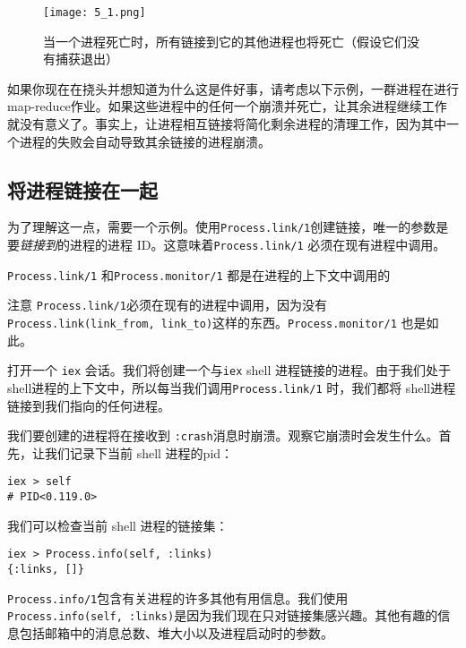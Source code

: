 \begin{figure}[!ht]
    \centering
    \texttt{[image: 5\_1.png]}
    \caption{当一个进程死亡时，所有链接到它的其他进程也将死亡（假设它们没有捕获退出）}
    \label{fig:5_1}
\end{figure}


如果你现在在挠头并想知道为什么这是件好事，请考虑以下示例，一群进程在进行map-reduce作业。如果这些进程中的任何一个崩溃并死亡，让其余进程继续工作就没有意义了。事实上，让进程相互链接将简化剩余进程的清理工作，因为其中一个进程的失败会自动导致其余链接的进程崩溃。


\subsection{将进程链接在一起}

为了理解这一点，需要一个示例。使用\texttt{Process.link/1}创建链接，唯一的参数是要\emph{链接到}的进程的进程 ID。这意味着\texttt{Process.link/1} 必须在现有进程中调用。

\texttt{Process.link/1} 和\texttt{Process.monitor/1} 都是在进程的上下文中调用的

注意 \texttt{Process.link/1}必须在现有的进程中调用，因为没有\texttt{Process.link(link\_from, link\_to)}这样的东西。\texttt{Process.monitor/1} 也是如此。

打开一个 \texttt{iex} 会话。我们将创建一个与\texttt{iex} shell 进程链接的进程。由于我们处于 shell进程的上下文中，所以每当我们调用\texttt{Process.link/1} 时，我们都将 shell进程链接到我们指向的任何进程。

我们要创建的进程将在接收到 \texttt{:crash}消息时崩溃。观察它崩溃时会发生什么。首先，让我们记录下当前 shell 进程的pid：

\begin{code}{}\begin{verbatim}
iex > self
# PID<0.119.0>
\end{verbatim}
\end{code}

我们可以检查当前 shell 进程的链接集：

\begin{code}{}
\begin{verbatim}
iex > Process.info(self, :links)
{:links, []}
\end{verbatim}
\end{code}

\texttt{Process.info/1}包含有关进程的许多其他有用信息。我们使用\texttt{Process.info(self, :links)}是因为我们现在只对链接集感兴趣。其他有趣的信息包括邮箱中的消息总数、堆大小以及进程启动时的参数。

